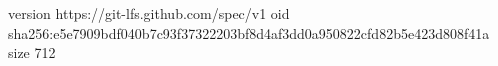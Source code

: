 version https://git-lfs.github.com/spec/v1
oid sha256:e5e7909bdf040b7c93f37322203bf8d4af3dd0a950822cfd82b5e423d808f41a
size 712
